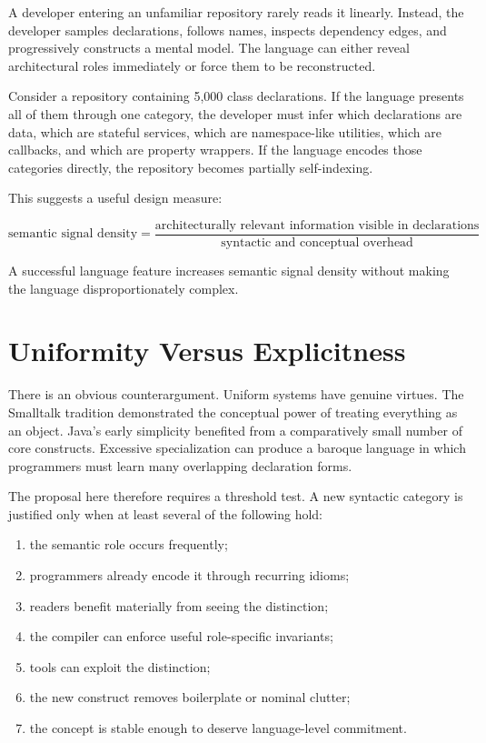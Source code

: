 \documentclass[11pt]{article}
\begin{document}
A developer entering an unfamiliar repository rarely reads it linearly. Instead, the developer samples declarations, follows names, inspects dependency edges, and progressively constructs a mental model. The language can either reveal architectural roles immediately or force them to be reconstructed.

Consider a repository containing 5,000 class declarations. If the language presents all of them through one category, the developer must infer which declarations are data, which are stateful services, which are namespace-like utilities, which are callbacks, and which are property wrappers. If the language encodes those categories directly, the repository becomes partially self-indexing.

This suggests a useful design measure:

\[
\text{semantic signal density}
= \frac{\text{architecturally relevant information visible in declarations}}
       {\text{syntactic and conceptual overhead}}
\]

A successful language feature increases semantic signal density without making the language disproportionately complex.

\section{Uniformity Versus Explicitness}

There is an obvious counterargument. Uniform systems have genuine virtues. The Smalltalk tradition demonstrated the conceptual power of treating everything as an object. Java's early simplicity benefited from a comparatively small number of core constructs. Excessive specialization can produce a baroque language in which programmers must learn many overlapping declaration forms.

The proposal here therefore requires a threshold test. A new syntactic category is justified only when at least several of the following hold:

\begin{enumerate}[nosep]
    \item the semantic role occurs frequently;
    \item programmers already encode it through recurring idioms;
    \item readers benefit materially from seeing the distinction;
    \item the compiler can enforce useful role-specific invariants;
    \item tools can exploit the distinction;
    \item the new construct removes boilerplate or nominal clutter;
    \item the concept is stable enough to deserve language-level commitment.
\end{enumerate}
\end{document}
